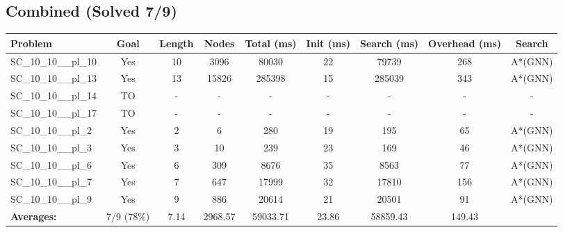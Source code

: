 \documentclass{article}
\begin{document}
\subsection*{Combined (Solved 7/9)}
\begin{tabular}{lcccccccc}
\toprule
Problem & Goal & Length & Nodes & Total (ms) & Init (ms) & Search (ms) & Overhead (ms) & Search \\
\midrule
SC\_10\_10\_\_pl\_10 & Yes & 10 & 3096 & 80030 & 22 & 79739 & 268 & A*(GNN) \\
SC\_10\_10\_\_pl\_13 & Yes & 13 & 15826 & 285398 & 15 & 285039 & 343 & A*(GNN) \\
SC\_10\_10\_\_pl\_14 & TO & - & - & - & - & - & - & - \\
SC\_10\_10\_\_pl\_17 & TO & - & - & - & - & - & - & - \\
SC\_10\_10\_\_pl\_2 & Yes & 2 & 6 & 280 & 19 & 195 & 65 & A*(GNN) \\
SC\_10\_10\_\_pl\_3 & Yes & 3 & 10 & 239 & 23 & 169 & 46 & A*(GNN) \\
SC\_10\_10\_\_pl\_6 & Yes & 6 & 309 & 8676 & 35 & 8563 & 77 & A*(GNN) \\
SC\_10\_10\_\_pl\_7 & Yes & 7 & 647 & 17999 & 32 & 17810 & 156 & A*(GNN) \\
SC\_10\_10\_\_pl\_9 & Yes & 9 & 886 & 20614 & 21 & 20501 & 91 & A*(GNN) \\
\textbf{Averages:} & 7/9 (78\%) & 7.14 & 2968.57 & 59033.71 & 23.86 & 58859.43 & 149.43 & \\
\bottomrule
\end{tabular}
\\[0.7cm]
\end{document}

